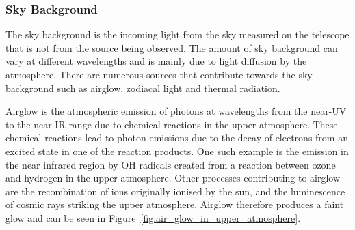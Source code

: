 		\subsubsection{Sky Background} %
		\label{ssub:sky_background}
			The sky background is the incoming light from the sky measured on the telescope that is not from the source being observed. The amount of sky background can vary at different wavelengths and is mainly due to light diffusion by the atmosphere. There are numerous sources that contribute towards the sky background such as airglow, zodiacal light and thermal radiation.

			Airglow is the atmospheric emission of photons at wavelengths from the near-UV to the near-IR range due to chemical reactions in the upper atmosphere\cite[p.~9]{An_atmospheric_radiation_model_for_Cerro_Paranal}. These chemical reactions lead to photon emissions due to the decay of electrons from an excited state in one of the reaction products. One such example is the emission in the near infrared region by OH radicals created from a reaction between ozone and hydrogen in the upper atmosphere\cite[p.~1]{MNRMNR11383}. Other processes contributing to airglow are the recombination of ions originally ionised by the sun, and the luminescence of cosmic rays striking the upper atmosphere. Airglow therefore produces a faint glow and can be seen in Figure~\ref{fig:air_glow_in_upper_atmosphere}.

